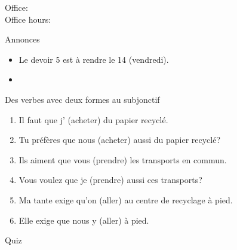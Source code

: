 \documentclass{beamer}
\subtitle[Subjonctif]{Surprise! C'est encore le subjonctif.}
\begin{document}
  \begin{frame}
    \titlepage
    \tiny{Office: \\
          Office hours: }
  \end{frame}

  \begin{frame}{Annonces}
    \begin{itemize}
      \item Le devoir 5 est à rendre le 14 (vendredi).
      \item[] 
    \end{itemize}
  \end{frame}

  \begin{frame}{Des verbes avec deux formes au subjonctif}
    \begin{enumerate}
      \item Il faut que j'\underline{} (acheter) du papier recyclé.
      \item Tu préfères que nous \underline{} (acheter) aussi du papier recyclé?
      \item Ils aiment que vous \underline{} (prendre) les transports en commun.
      \item Vous voulez que je \underline{} (prendre) aussi ces transports?
      \item Ma tante exige qu'on \underline{} (aller) au centre de recyclage à pied.
      \item Elle exige que nous y \underline{} (aller) à pied.
    \end{enumerate}
  \end{frame}

  \begin{frame}{}
    \begin{center}
      \Large Quiz
    \end{center}
  \end{frame}
\end{document}
